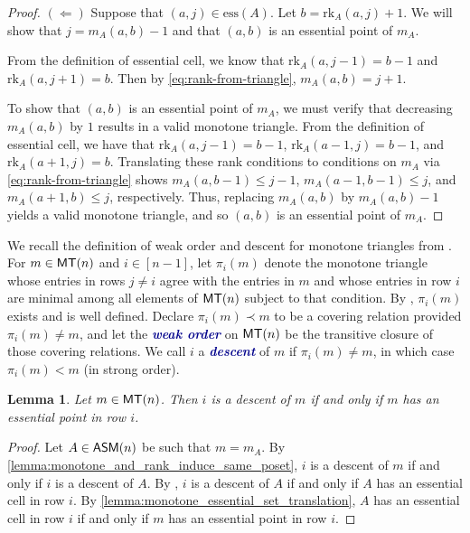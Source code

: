 \documentclass[12 pt]{amsart}
\newcommand{\newword}[1]{\textcolor{darkblue}{\textbf{\emph{#1}}}}
\newtheorem{lemma}[Theorem]{Lemma}
\numberwithin{equation}{section}
\newcommand{\rk}{\mathrm{rk}}
\newcommand{\ess}{\mathrm{ess}}
\theoremstyle{remark}
\newcommand{\asm}{{\sf ASM}}
\newcommand{\monotone}{{\sf MT}}
\begin{document}
\begin{proof}
\noindent $(\Leftarrow)$ Suppose that $(a,j)\in \ess(A)$. Let $b=\rk_A(a,j)+1$. We will show that $j=m_A(a,b)-1$ and that $(a,b)$ is an essential point of $m_A$.  

From the definition of essential cell, we know that $\rk_A(a,j-1)=b-1$ and $\rk_A(a,j+1)=b$.  Then by \cref{eq:rank-from-triangle}, $m_A(a,b)=j+1$.  

To show that $(a,b)$ is an essential point of $m_A$, we must verify that decreasing $m_A(a,b)$ by $1$ results in a valid monotone triangle.  From the definition of essential cell, we have that $\rk_A(a,j-1)=b-1$, $\rk_A(a-1,j)=b-1$, and $\rk_A(a+1,j)=b$.  Translating these rank conditions to conditions on $m_A$ via \cref{eq:rank-from-triangle} shows $m_A(a,b-1)\leq j-1$, $m_A(a-1,b-1)\leq j$, and $m_A(a+1,b)\leq j$, respectively. Thus, replacing $m_A(a,b)$ by $m_A(a,b)-1$ yields a valid monotone triangle, and so $(a,b)$ is an essential point of $m_A$.
\end{proof}

We recall the definition of weak order and descent for monotone triangles from \cite{HR20}. For $m \in \monotone(n)$ and $i \in [n-1]$, let $\pi_i(m)$ denote the monotone triangle whose entries in rows $j \neq i$ agree with the entries in $m$ and whose entries in row $i$ are minimal among all elements of $\monotone(n)$ subject to that condition. By \cite{HR20}, $\pi_i(m)$ exists and is well defined.  Declare $\pi_i(m) \prec m$ to be a covering relation provided $\pi_i(m) \neq m$, and let the \newword{weak order} on $\monotone(n)$ be the transitive closure of those covering relations. We call $i$ a \newword{descent} of $m$ if $\pi_i(m) \neq m$, in which case $\pi_i(m)<m$ (in strong order).

\begin{lemma}
    \label{descentessentialMT}
    Let $m \in \monotone(n)$. Then $i$ is a descent of $m$ if and only if $m$ has an essential point in row $i$.
\end{lemma}
\begin{proof}
    Let $A \in \asm(n)$ be such that $m = m_A$. By \cref{lemma:monotone_and_rank_induce_same_poset}, $i$ is a descent of $m$ if and only if $i$ is a descent of $A$. By \cite[Lemma 3.2]{EKW-main}, $i$ is a descent of $A$ if and only if $A$ has an essential cell in row $i$. By \cref{lemma:monotone_essential_set_translation}, $A$ has an essential cell in row $i$ if and only if $m$ has an essential point in row $i$. 
\end{proof}
\end{document}
